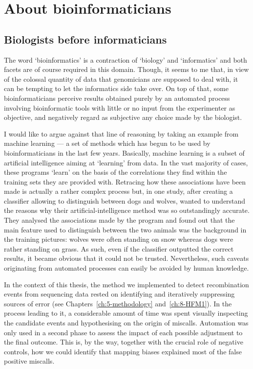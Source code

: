 \section{About bioinformaticians}

\subsection{Biologists before informaticians} 

The word ‘bioinformatics’ is a contraction of ‘biology’ and ‘informatics’ and both facets are of course required in this domain.
Though, it seems to me that, in view of the colossal quantity of data that genomicians are supposed to deal with, it can be tempting to let the informatics side take over.
On top of that, some bioinformaticians perceive results obtained purely by an automated process involving bioinformatic tools with little or no input from the experimenter as objective, and negatively regard as subjective any choice made by the biologist.

I would like to argue against that line of reasoning by taking an example from machine learning — a set of methods which has begun to be used by bioinformaticians in the last few years.
Basically, machine learning is a subset of artificial intelligence aiming at ‘learning’ from data.
In the vast majority of cases, these programs ‘learn’ on the basis of the correlations they find within the training sets they are provided with.
Retracing how these associations have been made is actually a rather complex process but, in one study, after creating a classifier allowing to distinguish between dogs and wolves, \citet{ribeiro2016why} wanted to understand the reasons why their artificial-intelligence method was so outstandingly accurate.
They analysed the associations made by the program and found out that the main feature used to distinguish between the two animals was the background in the training pictures: wolves were often standing on snow whereas dogs were rather standing on grass.
As such, even if the classifier outputted the correct results, it became obvious that it could not be trusted.
Nevertheless, such caveats originating from automated processes can easily be avoided by human knowledge.

In the context of this thesis, the method we implemented to detect recombination events from sequencing data rested on identifying and iteratively suppressing sources of error (see Chapters~\ref{ch:5-methodology} and~\ref{ch:8-HFM1}).
In the process leading to it, a considerable amount of time was spent visually inspecting the candidate events and hypothesising on the origin of miscalls.
Automation was only used in a second phase to assess the impact of each possible adjustment to the final outcome.
This is, by the way, together with the crucial role of negative controls, how we could identify that mapping biases explained most of the false positive miscalls.

